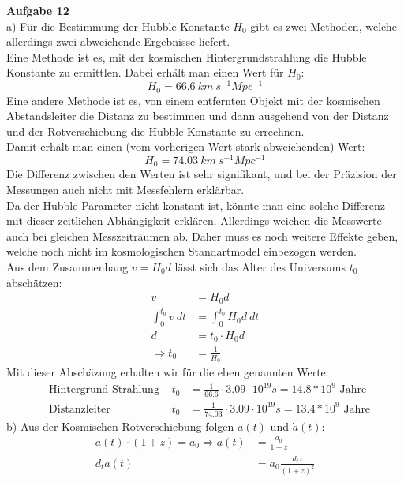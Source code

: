 \documentclass[11pt, a4paper]{article}
\begin{document}
\thispagestyle{fancy}
\noindent
{\large\textbf{Aufgabe 12}} \\[0.2cm]
a) Für die Bestimmung der Hubble-Konstante $H_0$ gibt es zwei Methoden, 
welche allerdings zwei abweichende Ergebnisse liefert.\\
Eine Methode ist es, mit der kosmischen Hintergrundstrahlung die Hubble
Konstante zu ermittlen. Dabei erhält man einen Wert für $H_0$:
\[
	H_0 = 66.6 \ km \ s^{-1} Mpc^{-1}
\]
Eine andere Methode ist es, von einem entfernten Objekt mit der 
kosmischen Abstandsleiter die Distanz zu bestimmen
und dann ausgehend von der 
Distanz und der Rotverschiebung die Hubble-Konstante zu errechnen.
\\
Damit erhält man einen (vom vorherigen Wert stark abweichenden) Wert:
\[
	H_0 = 74.03  \ km \ s^{-1} Mpc^{-1}
\]
Die Differenz zwischen den Werten ist sehr signifikant, und bei der 
Präzision der Messungen auch nicht mit Messfehlern erklärbar. \\
Da der Hubble-Parameter nicht konstant ist, könnte man eine 
solche Differenz mit dieser zeitlichen Abhängigkeit erklären. Allerdings 
weichen die Messwerte auch bei gleichen Messzeiträumen ab. Daher muss 
es noch weitere Effekte geben, welche noch nicht im kosmologischen 
Standartmodel einbezogen werden. 
\\[0.2cm]
Aus dem Zusammenhang $v = H_0 d$ lässt sich das Alter des Universums $t_0$
abschätzen:
\begin{align*}
	v &= H_0 d \\
	\int_0^{t_0} v \ dt &= \int_0^{t_0} H_0 d \ dt \\
	d &= t_0 \cdot H_0 d \\
	\Rightarrow 
	t_0 &= \frac{1}{H_0}
\end{align*}
Mit dieser Abschäzung erhalten wir für die eben genannten Werte:
\begin{align*}
	&\text{Hintergrund-Strahlung } &
	t_0 &= \frac{1}{66.6} \cdot 3.09 \cdot 10^{19} s
	= 14.8 * 10^9 \text{ Jahre}
	\\
	&\text{Distanzleiter } &
	t_0 &= \frac{1}{74.03} \cdot 3.09 \cdot 10^{19} s
	= 13.4 * 10^9 \text{ Jahre}
\end{align*}
\vspace{0.5cm}
b) Aus der Kosmischen Rotverschiebung folgen $a(t)$ und $\dot a(t)$:
\begin{align*}
	a(t) \cdot (1+z) = a_0 \Rightarrow 
	a(t) &= \frac{a_0}{1+z} \\
	d_t a(t) &= a_0 \frac{d_tz}{(1+z)^2}
\end{align*}
\end{document}
